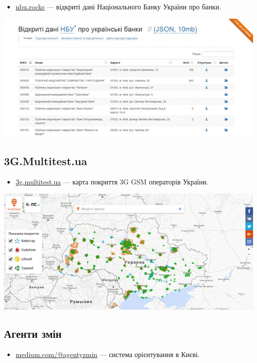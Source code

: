 \begin{itemize}
    \item \href{http://nbu.rocks/}{nbu.rocks} — відкриті дані Національного Банку України про банки.
\end{itemize}

\includegraphics{images/020.jpg}

\subsection{3G.Multitest.ua}

\begin{itemize}
    \item \href{http://3g.multitest.ua/}{3g.multitest.ua} — карта покриття 3G GSM операторів України.
\end{itemize}

\includegraphics{images/021.jpg}

\subsection{Агенти змін}

\begin{itemize}
    \item \href{https://medium.com/@agentyzmin}{medium.com/@agentyzmin} — система орієнтування в Києві.
\end{itemize}

